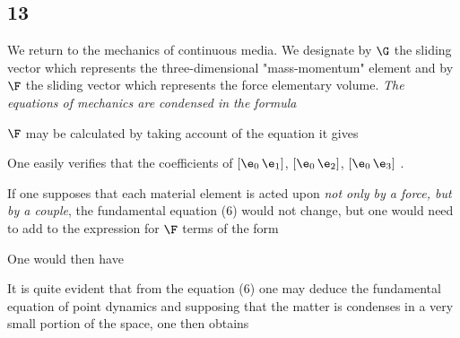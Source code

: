 
\subsection*{13}
We return to the mechanics of continuous media. We designate by $\G$ the sliding vector which represents the three-dimensional "mass-momentum" element and by $\F$ the sliding vector which represents the force  elementary volume. \textit{The equations of mechanics are condensed in the formula}

$\F$ may be calculated by taking account of the equation
it gives

One easily verifies that the coefficients of $[\e_0 \, \e_1]$, $[\e_0 \, \e_2]$, $[\e_0 \, \e_3]$ .

If one supposes that each material element is acted upon \textit{not only by a force, but by a couple}, the fundamental equation (6) would not change, but one would need to add to the expression for $\F$ terms of the form

One would then have

It is quite evident that from the equation (6) one may deduce the fundamental equation of point dynamics and supposing that the matter is condenses in a very small portion of the space, one then obtains

